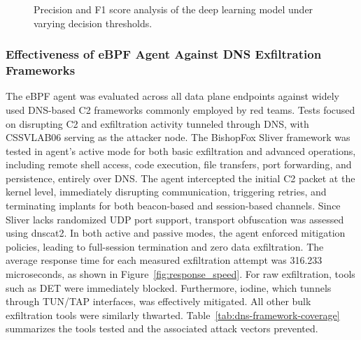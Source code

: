 \documentclass[letterpaper,twocolumn,10pt]{article}
\begin{document}
\begin{figure}[t]
  \centering
  \hfill
  \caption{Precision and F1 score analysis of the deep learning model under varying decision thresholds.}
  \label{fig:threshold-performance}
\end{figure}


\subsubsection{Effectiveness of eBPF Agent Against DNS Exfiltration Frameworks}
The eBPF agent was evaluated across all data plane endpoints against widely used DNS-based C2 frameworks commonly employed by red teams. Tests focused on disrupting C2 and exfiltration activity tunneled through DNS, with CSSVLAB06 serving as the attacker node. The BishopFox Sliver framework was tested in agent's active mode for both basic exfiltration and advanced operations, including remote shell access, code execution, file transfers, port forwarding, and persistence, entirely over DNS. The agent intercepted the initial C2 packet at the kernel level, immediately disrupting communication, triggering retries, and terminating implants for both beacon-based and session-based channels. Since Sliver lacks randomized UDP port support, transport obfuscation was assessed using dnscat2. In both active and passive modes, the agent enforced mitigation policies, leading to full-session termination and zero data exfiltration. The average response time for each measured exfiltration attempt was 316.233 microseconds, as shown in Figure~\ref{fig:response_speed}. For raw exfiltration, tools such as DET were immediately blocked. Furthermore, iodine, which tunnels through TUN/TAP interfaces, was effectively mitigated. All other bulk exfiltration tools were similarly thwarted. Table~\ref{tab:dns-framework-coverage} summarizes the tools tested and the associated attack vectors prevented.
\end{document}
